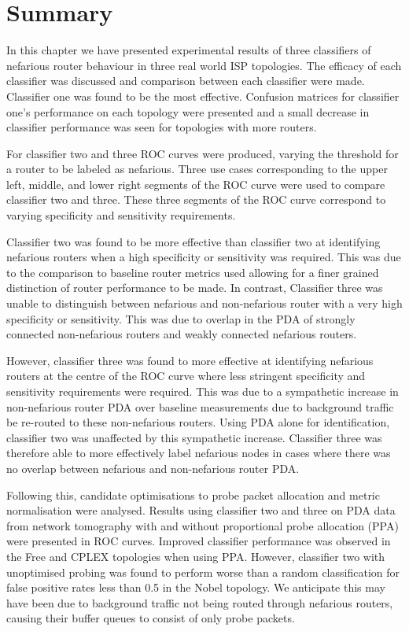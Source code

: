 \section{Summary}
In this chapter we have presented experimental results of three classifiers of nefarious router behaviour in three real world ISP topologies. The efficacy of each classifier was discussed and comparison between each classifier were made. Classifier one was found to be the most effective. Confusion matrices for classifier one's performance on each topology were presented and a small decrease in classifier performance was seen for topologies with more routers.\par
For classifier two and three ROC curves were produced, varying the threshold for a router to be labeled as nefarious. Three use cases corresponding to the upper left, middle, and lower right segments of the ROC curve were used to compare classifier two and three. These three segments of the ROC curve correspond to varying specificity and sensitivity requirements.\par
Classifier two was found to be more effective than classifier two at identifying nefarious routers when a high specificity or sensitivity was required. This was due to the comparison to baseline router metrics used allowing for a finer grained distinction of router performance to be made. In contrast, Classifier three was unable to distinguish between nefarious and non-nefarious router with a very high specificity or sensitivity. This was due to overlap in the PDA of strongly connected non-nefarious routers and weakly connected nefarious routers.\par
However, classifier three was found to more effective at identifying nefarious routers at the centre of the ROC curve where less stringent specificity and sensitivity requirements were required. This was due to a sympathetic increase in non-nefarious router PDA over baseline measurements due to background traffic be re-routed to these non-nefarious routers. Using PDA alone for identification, classifier two was unaffected by this sympathetic increase. Classifier three was therefore able to more effectively label nefarious nodes in cases where there was no overlap between nefarious and non-nefarious router PDA.\par
Following this, candidate optimisations to probe packet allocation and metric normalisation were analysed. Results using classifier two and three on PDA data from network tomography with and without proportional probe allocation (PPA) were presented in ROC curves. Improved classifier performance was observed in the Free and CPLEX topologies when using PPA. However, classifier two with unoptimised probing was found to perform worse than a random classification for false positive rates less than 0.5 in the Nobel topology. We anticipate this may have been due to background traffic not being routed through nefarious routers, causing their buffer queues to consist of only probe packets.\par
